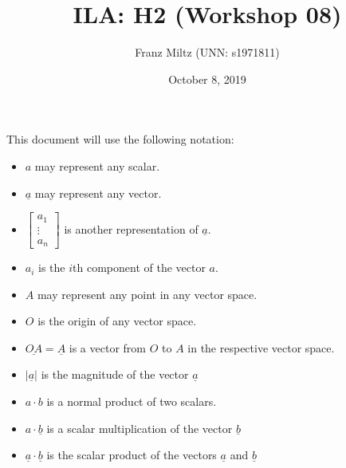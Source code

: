 \documentclass{article}
\title{ILA: H2 (Workshop 08)}
\author{Franz Miltz (UNN: s1971811)}
\date{October 8, 2019}
\renewcommand{\vec}{\underline}
\begin{document}
\maketitle
This document will use the following notation:
\begin{itemize}
    \item $a$ may represent any scalar.
    \item $\vec{a}$ may represent any vector.
    \item $\begin{bmatrix}
        a_1\\
        \vdots\\
        a_n
    \end{bmatrix}$ is another representation of $\vec a$. 
    \item $a_i$ is the $i$th component of the vector $a$.
    \item $A$ may represent any point in any vector space.
    \item $O$ is the origin of any vector space.
    \item $\vec{OA}=\vec{A}$ is a vector from $O$ to $A$ in the respective vector space.
    \item $\vert\vec{a}\vert$ is the magnitude of the vector $\vec{a}$
    \item $a\cdot b$ is a normal product of two scalars.
    \item $a\cdot\vec{b}$ is a scalar multiplication of the vector $\vec{b}$
    \item $\vec{a}\cdot\vec{b}$ is the scalar product of the vectors $\vec{a}$ and $\vec{b}$
\end{itemize}
\end{document}
